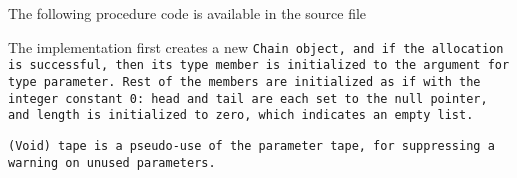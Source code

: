 The following procedure code is available in the source file

The implementation first creates a new \tt{Chain} object,
and if the allocation is successful, then its \tt{type} member
is initialized to the argument for \tt{type} parameter.
Rest of the members are initialized as if with the integer constant \tt{0}:
\tt{head} and \tt{tail} are each set to the null pointer, and
\tt{length} is initialized to zero, which indicates an empty list.

\note \tt{(Void) tape} is a pseudo-use of the parameter
\tt{tape}, for suppressing a warning on unused parameters.
